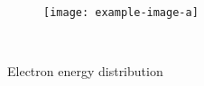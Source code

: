 \begin{figure}[!ht]
	\begin{subfigure}{0.5\textwidth}
		\texttt{[image: example-image-a]}
		\caption{}
		\label{}
	\end{subfigure}
	~
	\begin{subfigure}{0.5\textwidth}
		
		\caption{}
		\label{}
	\end{subfigure}
	\caption[]{Electron energy distribution}
	\label{chap3:garfieldangle}
\end{figure}
